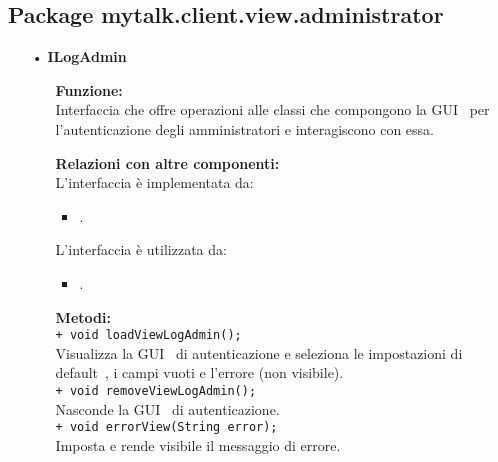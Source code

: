 {\begin{sloppypar}

	\subsection{Package mytalk.client.view.administrator} {

	\begin{itemize}
	
		\item[•] \textbf{ILogAdmin}
			\begin{itemize}
				\item[]  \textbf{Funzione:} \\
				Interfaccia che offre operazioni alle classi che compongono la GUI\g~ per l'autenticazione degli amministratori e interagiscono con essa.
				
				\item[]  \textbf{Relazioni con altre componenti:} \\
				L'interfaccia è implementata da:
				\begin{itemize}
					\item {}.
				\end{itemize}
				L’interfaccia è utilizzata da:
				\begin{itemize}
					\item {}.
				\end{itemize}
				
				\item[]  \textbf{Metodi:}\\
				\texttt{+ void loadViewLogAdmin();}\\
				Visualizza la GUI\g~ di autenticazione e seleziona le impostazioni di default\g~, i campi vuoti e l'errore (non visibile).\\

				\texttt{+ void removeViewLogAdmin();}\\
				Nasconde la GUI\g~ di autenticazione.\\

				\texttt{+ void errorView(String error);}\\
				Imposta e rende visibile il messaggio di errore.\\
			\end{itemize}
		

\end{itemize}}
\end{sloppypar}}

